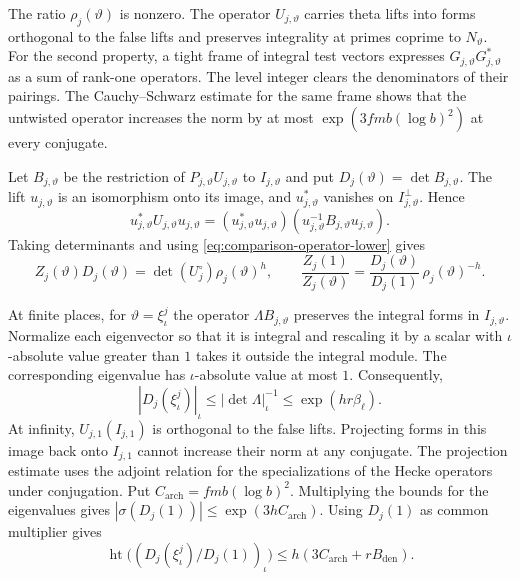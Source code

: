 The ratio \(\rho_j(\vartheta)\) is nonzero. The operator \(U_{j,\vartheta}\)
carries theta lifts into forms orthogonal to the false lifts and preserves
integrality at primes coprime to \(N_\vartheta\). For the second property,
a tight frame of integral test vectors expresses
\(G_{j,\vartheta}G_{j,\vartheta}^*\) as a sum of rank-one operators.
The level integer clears the denominators of their pairings.
The Cauchy--Schwarz estimate for the same frame shows that the untwisted
operator increases the norm by at most \(\exp(3fmb(\log b)^2)\) at every
conjugate.

Let \(B_{j,\vartheta}\) be the restriction of
\(P_{j,\vartheta}U_{j,\vartheta}\) to \(I_{j,\vartheta}\) and put
\(D_j(\vartheta)=\det B_{j,\vartheta}\). The lift \(u_{j,\vartheta}\)
is an isomorphism onto its image, and \(u_{j,\vartheta}^*\) vanishes
on \(I_{j,\vartheta}^\perp\). Hence
\[
 u_{j,\vartheta}^* U_{j,\vartheta} u_{j,\vartheta}
  =(u_{j,\vartheta}^*u_{j,\vartheta})
    (u_{j,\vartheta}^{-1} B_{j,\vartheta}u_{j,\vartheta}).
\]
Taking determinants and using \eqref{eq:comparison-operator-lower} gives
\[
 Z_j(\vartheta)D_j(\vartheta)
      =\det(U_j^\circ)\rho_j(\vartheta)^h,\qquad
 \frac{Z_j(1)}{Z_j(\vartheta)}
   =\frac{D_j(\vartheta)}{D_j(1)}\,\rho_j(\vartheta)^{-h}.
\]

At finite places, for \(\vartheta=\xi_\iota^j\) the operator
\(\Lambda B_{j,\vartheta}\) preserves the integral forms in
\(I_{j,\vartheta}\). Normalize each eigenvector so that it is integral
and rescaling it by a scalar with \(\iota\)-absolute value greater than
\(1\) takes it outside the integral module. The corresponding eigenvalue
has \(\iota\)-absolute value at most \(1\). Consequently,
\[
 |D_j(\xi_\iota^j)|_\iota
   \le|\det\Lambda|_\iota^{-1}
   \le\exp(hr\beta_\ell).
\]
At infinity, \(U_{j,1}(I_{j,1})\) is orthogonal to the false lifts.
Projecting forms in this image back onto \(I_{j,1}\) cannot increase
their norm at any conjugate. The projection estimate uses the adjoint
relation for the specializations of the Hecke operators under conjugation.
Put \(C_{\mathrm{arch}}=fmb(\log b)^2\). Multiplying the bounds for the
eigenvalues gives \(|\sigma(D_j(1))|\le\exp(3h C_{\mathrm{arch}})\).
Using \(D_j(1)\) as common multiplier gives
\[
 \operatorname{ht}\bigl((D_j(\xi_\iota^j)/D_j(1))_\iota\bigr)
     \le h(3C_{\mathrm{arch}}+rB_{\mathrm{den}}).
\]


